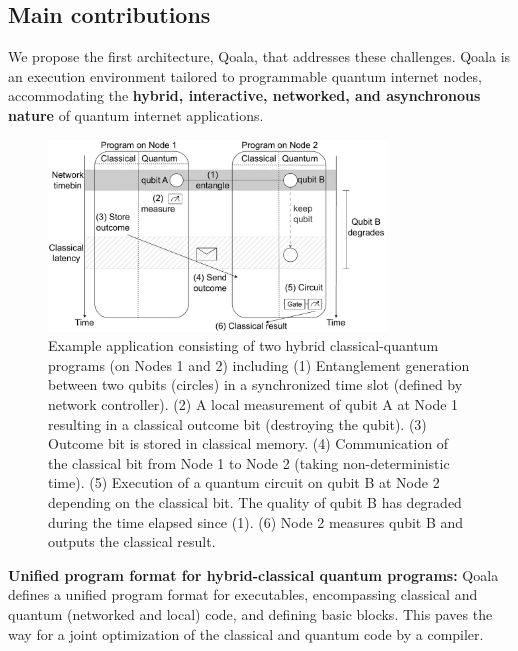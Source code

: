 \subsection{Main contributions}
We propose the first architecture, Qoala, that addresses these challenges. Qoala is an execution environment tailored to programmable quantum internet nodes, accommodating the \textbf{hybrid, interactive, networked, and asynchronous nature} of quantum internet applications. 

\begin{figure}[t]
    \centering
    \includegraphics[width=0.8\textwidth]{figures/qoala/program_illustration.pdf}
    \caption{Example application consisting of two hybrid classical-quantum programs (on Nodes 1 and 2) including
        (1) Entanglement generation between two qubits (circles) in a synchronized time slot (defined by  network controller).
        (2) A local measurement of qubit A at Node 1 resulting in a classical outcome bit (destroying the qubit).
        (3) Outcome bit is stored in classical memory.
        (4) Communication of the classical bit from Node 1 to Node 2 (taking non-deterministic time).
        (5) Execution of a quantum circuit on qubit B at Node 2 depending on the classical bit. The quality of qubit B has degraded during the time elapsed since (1). 
        (6) Node 2 measures qubit B and outputs the classical result.
    }
    \label{qoala:fig:program_illustration}
\end{figure}

\textbf{Unified program format for hybrid-classical quantum programs:}
Qoala defines a unified program format for executables, encompassing classical and quantum (networked and local) code, and defining basic blocks.
This paves the way for a joint optimization of the classical and quantum code by a compiler.

